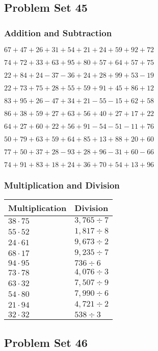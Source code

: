 \hypertarget{problem-set-45}{%
\subsection{Problem Set 45}\label{problem-set-45}}

\hypertarget{addition-and-subtraction-85}{%
\subsubsection{Addition and
Subtraction}\label{addition-and-subtraction-85}}

\(67+47+26+31+54+21+24+59+92+ 72\)

\(74+72+33+63+95+80+57+64+57+75\)

\(22+84+24-37-36+24+28+99+53-19\)

\(22+73+75+28+55+59+91+45+86+12\)

\(83+95+26-47+34+21-55-15+62+58\)

\(86+38+59+27+63+56+40+27+17+22\)

\(64+27+60+22+56+91-54-51-11+76\)

\(50+79+63+59+64+85+13+88+20+60\)

\(77+50+37+28-93+28+96-31+60-66\)

\(74+91+83+18+24+36+70+54+13+96\)

\hypertarget{multiplication-and-division-85}{%
\subsubsection{Multiplication and
Division}\label{multiplication-and-division-85}}

\begin{longtable}[]{@{}ll@{}}
\toprule
Multiplication & Division\tabularnewline
\midrule
\endhead
\(38\cdot75\) & \(3,765÷7\)\tabularnewline
\(55\cdot52\) & \(1,817÷8\)\tabularnewline
\(24\cdot61\) & \(9,673÷2\)\tabularnewline
\(68\cdot17\) & \(9,235÷7\)\tabularnewline
\(94\cdot95\) & \(736÷6\)\tabularnewline
\(73\cdot78\) & \(4,076÷3\)\tabularnewline
\(63\cdot32\) & \(7,507÷9\)\tabularnewline
\(54\cdot80\) & \(7,990÷6\)\tabularnewline
\(21\cdot94\) & \(4,721÷2\)\tabularnewline
\(32\cdot32\) & \(538÷3\)\tabularnewline
\bottomrule
\end{longtable}

\hypertarget{problem-set-46}{%
\subsection{Problem Set 46}\label{problem-set-46}}

